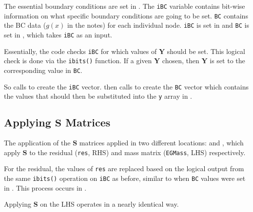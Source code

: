 \documentclass[12pt, letterpaper, twoside]{article}
\renewcommand{\vec}[1]{\bm{#1}}
\newcommand{\ttt}[1]{\texttt{#1}}
\newcommand{\Y}{\vec{Y}}
\newcommand{\Sm}{\vec{S}}
\newcommand{\0}{\vec{0}}
\begin{document}
The essential boundary conditions are set in . The \ttt{iBC} variable contains bit-wise information on what specific boundary conditions are going to be set. \ttt{BC} contains the BC data (\(g(x)\) in the notes) for each individual node. 
\ttt{iBC} is set in  and \ttt{BC} is set in , which takes \ttt{iBC} as an input. 

Essentially, the code checks \ttt{iBC} for which values of \(\Y\) should be set. This logical check is done via the \ttt{ibits()} function. If a given \(\Y\) chosen, then \(\Y\) is set to the corresponding value in \ttt{BC}.

So  calls  to create the \ttt{iBC} vector.  then calls  to create the \ttt{BC} vector which contains the values that should then be substituted into the \ttt{y} array in .


\subsection{Applying \(\vec{S}\) Matrices}
The application of the \(\Sm\) matrices applied in two different locations:  and , which apply \(\Sm\) to the residual (\ttt{res}, RHS) and mass matrix (\ttt{EGMass}, LHS) respectively. 

For the residual, the values of \ttt{res} are replaced based on the logical output from the same \ttt{ibits()} operation on \ttt{iBC} as before, similar to when \ttt{BC} values were set in . This process occurs in . 

Applying \(\Sm\) on the LHS operates in a nearly identical way. 
\end{document}
